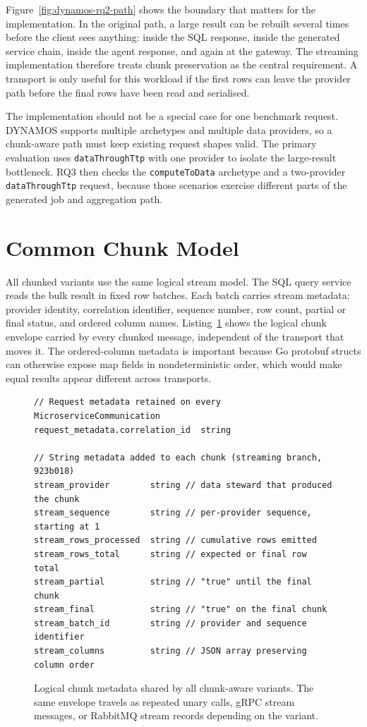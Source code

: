 Figure~\ref{fig:dynamos-rq2-path} shows the boundary that matters for the implementation. In the original path, a large result can be rebuilt several times before the client sees anything: inside the SQL response, inside the generated service chain, inside the agent response, and again at the gateway. The streaming implementation therefore treats chunk preservation as the central requirement. A transport is only useful for this workload if the first rows can leave the provider path before the final rows have been read and serialised.

The implementation should not be a special case for one benchmark request. DYNAMOS supports multiple archetypes and multiple data providers, so a chunk-aware path must keep existing request shapes valid. The primary evaluation uses \texttt{dataThroughTtp} with one provider to isolate the large-result bottleneck. RQ3 then checks the \texttt{computeToData} archetype and a two-provider \texttt{dataThroughTtp} request, because those scenarios exercise different parts of the generated job and aggregation path.

\section{Common Chunk Model}

All chunked variants use the same logical stream model. The SQL query service reads the bulk result in fixed row batches. Each batch carries stream metadata: provider identity, correlation identifier, sequence number, row count, partial or final status, and ordered column names. Listing~\ref{lst:chunk-metadata} shows the logical chunk envelope carried by every chunked message, independent of the transport that moves it. The ordered-column metadata is important because Go protobuf structs can otherwise expose map fields in nondeterministic order, which would make equal results appear different across transports.

\begin{figure}[!htbp]
\footnotesize
\begin{verbatim}
// Request metadata retained on every MicroserviceCommunication
request_metadata.correlation_id  string

// String metadata added to each chunk (streaming branch, 923b018)
stream_provider        string // data steward that produced the chunk
stream_sequence        string // per-provider sequence, starting at 1
stream_rows_processed  string // cumulative rows emitted
stream_rows_total      string // expected or final row total
stream_partial         string // "true" until the final chunk
stream_final           string // "true" on the final chunk
stream_batch_id        string // provider and sequence identifier
stream_columns         string // JSON array preserving column order
\end{verbatim}
\caption{Logical chunk metadata shared by all chunk-aware variants. The same envelope travels as repeated unary calls, gRPC stream messages, or RabbitMQ stream records depending on the variant.}
\label{lst:chunk-metadata}
\end{figure}

